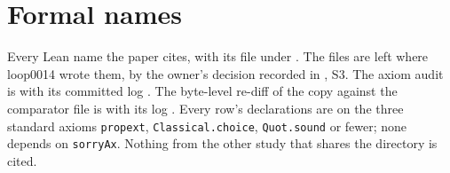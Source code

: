 \section{Formal names}
\label{app:lean}
\begingroup\sloppy

Every Lean name the paper cites, with its file under
. The files are left where
loop0014 wrote them, by the owner's decision recorded in
, S3. The axiom audit is
 with its committed log
. The byte-level re-diff of the
copy against the comparator file is 
with its log . Every row's declarations are
on the three standard axioms \texttt{propext}, \texttt{Classical.choice},
\texttt{Quot.sound} or fewer; none depends on \texttt{sorryAx}. Nothing from
the other study that shares the directory is cited.


